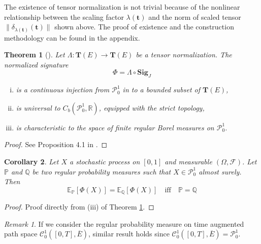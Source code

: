 \documentclass[12pt]{report}
\newtheorem{theorem}{Theorem}[chapter]
\newtheorem{corollary}[theorem]{Corollary}
\theoremstyle{definition}
\theoremstyle{remark}
\newtheorem*{remark}{Remark}
\newcommand{\R}{\mathbb{R}}
\newcommand{\E}{\mathbb{E}}
\renewcommand{\P}{\mathbb{P}}
\begin{document}
The existence of tensor normalization is not trivial because of the nonlinear relationship between the scaling factor $\lambda(\mathbf{t})$ and the norm of scaled tensor $\lVert \delta_{\lambda(\mathbf{t} )}(\mathbf{t} ) \rVert $ shown above. The proof of existence and the construction methodology can be found in the appendix. 
\begin{theorem}[\cite{chevyrev2018signature}]\label{moment_law}
  Let $\Lambda \colon \mathbf{T}(E) \to \mathbf{T}(E)$ be a tensor normalization. The normalized signature 
  \begin{equation}
    \Phi = \Lambda \circ \mathbf{Sig}_{J}
  \end{equation}
  \begin{enumerate}[(i)]
    \item is a continuous injection from $\mathcal{P}_{0}^{1}$ in to a bounded subset of $\mathbf{T}(E)$,
    \item is universal to $C_{b}(\mathcal{P}_{0}^{1},\R)$, equipped with the strict topology, 
    \item is characteristic to the space of finite regular Borel measures on $\mathcal{P}_{0}^{1}$.
  \end{enumerate}
\end{theorem}  
\begin{proof}
  See Proposition 4.1 in \cite{chevyrev2018signature}.
\end{proof}
\begin{corollary}\label{equalequal}
  Let $X$ a stochastic process on $[0,1]$ and measurable $(\Omega,\mathcal{F})$. Let $\P$ and $\mathbb{Q}$ be two regular probability measures such that $X \in \mathcal{P}_{0}^{1}$ almost surely. Then 
  \begin{equation}
    \E_{\P}[\Phi(X)] = \E_{\mathbb{Q}}[\Phi(X)]\quad\text{iff}\quad \P = \mathbb{Q}
  \end{equation} 
\end{corollary}
\begin{proof}
 Proof directly from (iii) of Theorem \ref{moment_law}.
\end{proof}
\begin{remark}
  If we consider the regular probability measure on time augmented path space $\mathcal{C}^{1}_{0}([0,T],\overline{E})$, similar result holds since $\mathcal{C}^{1}_{0}([0,T],\overline{E}) = \mathcal{P}_{0}^{1}$.
\end{remark}
\end{document}

